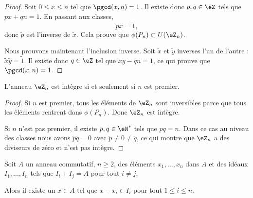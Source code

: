 \begin{proof}
    Soit \( 0\leq x\leq n\) tel que \( \pgcd(x,n)=1\). Il existe donc \( p,q\in\eZ\) tels que \( px+qn=1\). En passant aux classes,
    \begin{equation}
        \tilde p\tilde x=\tilde 1,
    \end{equation}
    donc \( \tilde p\) est l'inverse de \( \tilde x\). Cela prouve que \( \phi(P_n)\subset U(\eZ_n)\).

    Nous prouvons maintenant l'inclusion inverse. Soit \( \tilde x\) et \( \tilde y\) inverses l'un de l'autre : $\tilde x\tilde y=\tilde 1$. Il existe donc \( q\in\eZ\) tel que \( xy-qn=1\), ce qui prouve que \( \pgcd(x,n)=1\).

\end{proof}

\begin{corollary}   \label{CorZnInternprem}
    L'anneau \( \eZ_n\) est intègre si et seulement si \( n\) est premier.
\end{corollary}

\begin{proof}
    Si \( n\) est premier, tous les éléments de \( \eZ_n\) sont inversibles parce que tous les éléments rentrent dans \( \phi(P_n)\). Donc \( \eZ_n\) est intègre.

    Si \( n\) n'est pas premier, il existe \( p,q\in\eN^*\) tels que \( pq=n\). Dans ce cas au niveau des classes nous avons \( \tilde p\tilde q=0\) avec \( \tilde p\neq 0\neq\tilde q\), ce qui montre que \( \eZ_n\) a des diviseurs de zéro et n'est pas intègre.
\end{proof}

\begin{theorem}
    Soit \( A\) un anneau commutatif, \( n\geq 2\), des éléments \( x_1,\ldots,x_n\) dans \( A\) et des idéaux \( I_1,\ldots,I_n\) tels que \( I_i+I_j=A\) pour tout \( i\neq j\).

    Alors il existe un \( x\in A\) tel que \( x-x_i\in I_i\) pour tout \( 1\leq i\leq n\).
\end{theorem}

